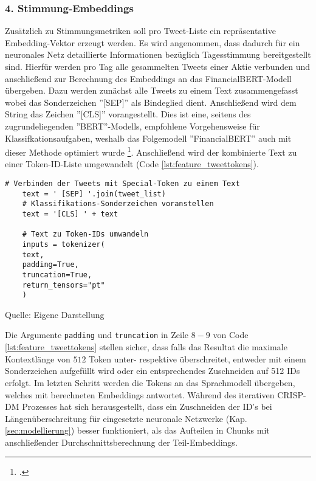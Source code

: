 \subsubsection*{4. Stimmung-Embeddings}
Zusätzlich zu Stimmungsmetriken soll pro Tweet-Liste ein repräsentative Embedding-Vektor erzeugt werden. Es wird angenommen, dass dadurch für ein neuronales Netz detaillierte Informationen bezüglich Tagesstimmung bereitgestellt sind. Hierfür werden pro Tag alle gesammelten Tweets einer Aktie verbunden und anschließend zur Berechnung des Embeddings an das FinancialBERT-Modell übergeben. 
Dazu werden zunächst alle Tweets zu einem Text zusammengefasst wobei das Sonderzeichen ''[SEP]'' als Bindeglied dient. Anschließend wird dem String das Zeichen ''[CLS]'' vorangestellt. Dies ist eine, seitens des zugrundeliegenden ''BERT''-Modells, empfohlene Vorgehensweise für Klassifkationsaufgaben, weshalb das Folgemodell ''FinancialBERT'' auch mit dieser Methode optimiert wurde \footcite[Kap. 5.3]{hazourli2022financialbert}.
Anschließend wird der kombinierte Text zu einer Token-ID-Liste umgewandelt (Code \ref{lst:feature_tweettokens}). 
\begin{lstlisting}[caption={Umwandlung von Tweets zu Token-IDs}, label=lst:feature_tweettokens, captionpos=t]
	# Verbinden der Tweets mit Special-Token zu einem Text
	text = ' [SEP] '.join(tweet_list)
	# Klassifikations-Sonderzeichen voranstellen
	text = '[CLS] ' + text
	
	# Text zu Token-IDs umwandeln
	inputs = tokenizer(
	text, 
	padding=True, 
	truncation=True, 
	return_tensors="pt"
	)
\end{lstlisting}
\vspace{-1.3em}
\normalsize{Quelle: Eigene Darstellung}

Die Argumente \texttt{padding} und \texttt{truncation} in Zeile $8-9$ von Code \ref{lst:feature_tweettokens} stellen sicher, dass falls das Resultat die maximale Kontextlänge von $512$ Token unter- respektive überschreitet, entweder mit einem Sonderzeichen aufgefüllt wird oder ein entsprechendes Zuschneiden auf 512 IDs erfolgt.
Im letzten Schritt werden die Tokens an das Sprachmodell übergeben, welches mit berechneten Embeddings antwortet.
Während des iterativen \ac{CRISP-DM} Prozesses hat sich herausgestellt, dass ein Zuschneiden der ID's bei Längenüberschreitung für eingesetzte neuronale Netzwerke (Kap. \ref{sec:modellierung}) besser funktioniert, als das Aufteilen in Chunks mit anschließender Durchschnittsberechnung der Teil-Embeddings.

